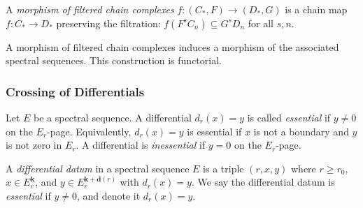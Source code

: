 \begin{definition}\label{prereq:def:filtered-complex-morphism}
    A \emph{morphism of filtered chain complexes} $f: (C_*, F) \to (D_*, G)$ is a chain map $f: C_* \to D_*$ preserving the filtration: $f(F^s C_n) \subseteq G^s D_n$ for all $s, n$.
\end{definition}

\begin{proposition}\label{prereq:prop:filtered-complex-functoriality}
    A morphism of filtered chain complexes induces a morphism of the associated spectral sequences. This construction is functorial.
\end{proposition}

\subsubsection{Crossing of Differentials}\label{sec:prereq-crossing}

\begin{definition}\label{prereq:def:essential-differential}
    \leanok
    Let $E$ be a spectral sequence. A differential $d_r(x) = y$ is called \emph{essential} if $y \ne 0$ on the $E_r$-page. Equivalently, $d_r(x) = y$ is essential if $x$ is not a boundary and $y$ is not zero in $E_r$. A differential is \emph{inessential} if $y = 0$ on the $E_r$-page.
\end{definition}

\begin{definition}\label{prereq:def:differential-data}
    \leanok
    A \emph{differential datum} in a spectral sequence $E$ is a triple $(r, x, y)$ where $r \ge r_0$, $x \in E_r^{\mathbf{k}}$, and $y \in E_r^{\mathbf{k}+\mathbf{d}(r)}$ with $d_r(x) = y$. We say the differential datum is \emph{essential} if $y \ne 0$, and denote it $d_r(x) = y$.
\end{definition}

